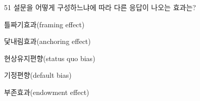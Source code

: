 \begin{question}{51}
설문을 어떻게 구성하느냐에 따라 다른 응답이 나오는 효과는?
\begin{choices}
  \item 틀짜기효과(framing effect)
  \item 닻내림효과(anchoring effect)
  \item 현상유지편향(status quo bias)
  \item 기정편향(default bias)
  \item 부존효과(endowment effect)
\end{choices}
\end{question}

